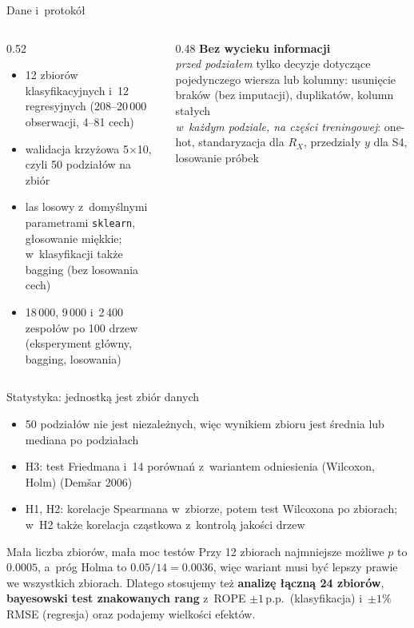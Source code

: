 \documentclass[aspectratio=169,11pt]{beamer}
\begin{document}
\begin{frame}{Dane i~protokół}
\begin{columns}[T]
\begin{column}{0.52\textwidth}
\begin{itemize}
  \item 12 zbiorów klasyfikacyjnych i~12 regresyjnych (208--20\,000 obserwacji, 4--81 cech)
  \item walidacja krzyżowa 5$\times$10, czyli 50 podziałów na zbiór
  \item las losowy z~domyślnymi parametrami \texttt{sklearn}, głosowanie miękkie; \\ w~klasyfikacji także bagging (bez losowania cech)
  \item 18\,000, 9\,000 i~2\,400 zespołów po 100 drzew (eksperyment główny, bagging, losowania)
\end{itemize}
\end{column}
\begin{column}{0.48\textwidth}
\textbf{Bez wycieku informacji}\\[0.2em]
\small
\emph{przed podziałem} tylko decyzje dotyczące pojedynczego wiersza lub kolumny:
usunięcie braków (bez imputacji), duplikatów, kolumn stałych\\[0.4em]
\emph{w~każdym podziale, na części treningowej}: one-hot, standaryzacja dla $R_X$, przedziały $y$ dla S4, losowanie próbek
\end{column}
\end{columns}
\end{frame}

\begin{frame}{Statystyka: jednostką jest zbiór danych}
\begin{itemize}
  \item 50 podziałów nie jest niezależnych, więc wynikiem zbioru jest średnia lub mediana po podziałach
  \item H3: test Friedmana i~14 porównań z~wariantem odniesienia (Wilcoxon, Holm) (Demšar 2006)
  \item H1, H2: korelacje Spearmana w~zbiorze, potem test Wilcoxona po zbiorach; w~H2 także \alert{korelacja cząstkowa} z~kontrolą jakości drzew
\end{itemize}
\vspace{0.3em}
\begin{alertblock}{Mała liczba zbiorów, mała moc testów}
Przy 12 zbiorach najmniejsze możliwe $p$ to $0.0005$, a~próg Holma to $0.05/14 = 0.0036$, więc wariant musi być lepszy prawie we wszystkich zbiorach. Dlatego stosujemy też \textbf{analizę łączną 24 zbiorów}, \textbf{bayesowski test znakowanych rang} z~ROPE $\pm 1$\,p.p.\ (klasyfikacja) i~$\pm 1\%$ RMSE (regresja) oraz podajemy wielkości efektów.
\end{alertblock}
\end{frame}


\end{document}
